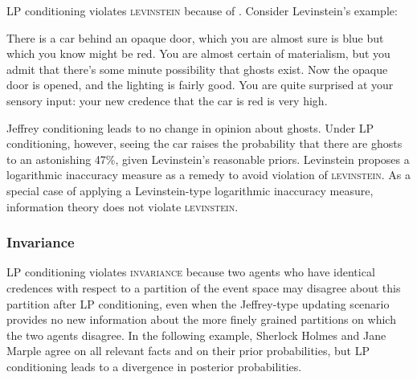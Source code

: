 \documentclass[12pt]{article}
\begin{document}
LP conditioning violates \textsc{levinstein} because of 
. Consider Levinstein's example:


\begin{example}
  \label{ex:levinstein}
  There is a car behind an opaque door, which you are almost sure is
  blue but which you know might be red. You are almost certain of
  materialism, but you admit that there's some minute possibility that
  ghosts exist. Now the opaque door is opened, and the lighting is
  fairly good. You are quite surprised at your sensory input: your new
  credence that the car is red is very high.
\end{example}

Jeffrey conditioning leads to no change in opinion about ghosts. Under
LP conditioning, however, seeing the car raises the probability that
there are ghosts to an astonishing 47\%, given Levinstein's reasonable
priors. Levinstein proposes a logarithmic inaccuracy measure as a
remedy to avoid violation of \textsc{levinstein}. As a special case of
applying a Levinstein-type logarithmic inaccuracy measure, information
theory does not violate \textsc{levinstein}.

\subsubsection{Invariance}
\label{Invariance}

LP conditioning violates \textsc{invariance} because two agents who
have identical credences with respect to a partition of the event
space may disagree about this partition after LP conditioning, even
when the Jeffrey-type updating scenario provides no new information
about the more finely grained partitions on which the two agents
disagree. In the following example, Sherlock Holmes and Jane Marple
agree on all relevant facts and on their prior probabilities, but LP
conditioning leads to a divergence in posterior probabilities.
\end{document}
